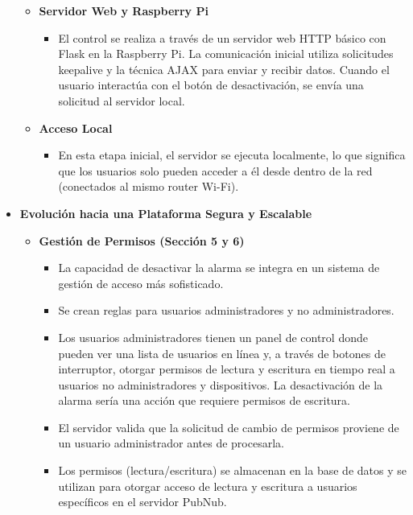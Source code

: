 \documentclass{report}
\begin{document}
\begin{itemize}
\begin{itemize}
        \item \textbf{Servidor Web y Raspberry Pi}
        \begin{itemize}
            \item El control se realiza a través de un servidor web HTTP básico con Flask en la Raspberry Pi. La comunicación inicial utiliza solicitudes
            keepalive y la técnica AJAX para enviar y recibir datos. Cuando el usuario interactúa con el botón de desactivación, se envía una solicitud 
            al servidor local.
        \end{itemize}

        \item \textbf{Acceso Local}
        \begin{itemize}
            \item En esta etapa inicial, el servidor se ejecuta localmente, lo que significa que los usuarios solo pueden acceder a él desde dentro de la 
            red (conectados al mismo router Wi-Fi).
        \end{itemize}
    \end{itemize}

    \item \textbf{Evolución hacia una Plataforma Segura y Escalable}
    \begin{itemize}

        \item \textbf{Gestión de Permisos (Sección 5 y 6)}
        \begin{itemize}
            \item La capacidad de desactivar la alarma se integra en un sistema de gestión de acceso más sofisticado.
            \item Se crean reglas para usuarios administradores y no administradores.
            \item Los usuarios administradores tienen un panel de control donde pueden ver una lista de usuarios en línea y, a través de botones de 
            interruptor, otorgar permisos de lectura y escritura en tiempo real a usuarios no administradores y dispositivos. La desactivación de la alarma 
            sería una acción que requiere permisos de escritura.
            \item El servidor valida que la solicitud de cambio de permisos proviene de un usuario administrador antes de procesarla.
            \item Los permisos (lectura/escritura) se almacenan en la base de datos y se utilizan para otorgar acceso de lectura y escritura a usuarios 
            específicos en el servidor PubNub.
        \end{itemize}


\end{itemize}
\end{itemize}
\end{document}
